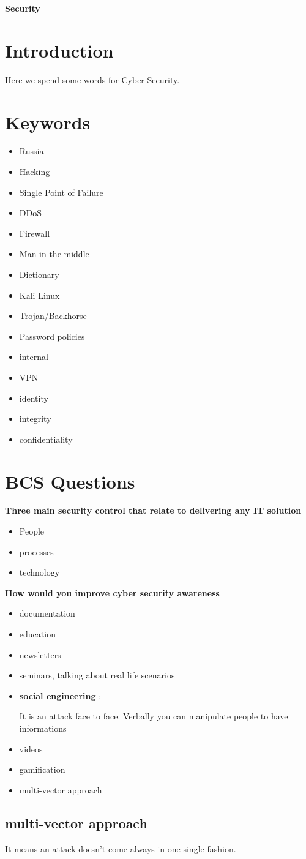 \documentclass[a4paper,12pt]{article}
\begin{document}
\textbf{Security}


\tableofcontents
\clearpage

 
\section{Introduction}
Here we spend some words for Cyber Security.
\section{Keywords}

\begin{itemize}
\item Russia
\item Hacking
\item Single Point of Failure
\item DDoS
\item Firewall
\item Man in the middle
\item Dictionary
\item Kali Linux
\item Trojan/Backhorse
\item Password policies
\item internal
\item VPN
\item identity 
\item integrity
\item confidentiality
\end{itemize}

\section{BCS Questions}

\textbf {Three main security control that relate to delivering any IT solution}
\begin{itemize}
\item People
\item processes
\item technology 
\end{itemize}


\textbf {How would you improve cyber security awareness}
\begin{itemize}
\item documentation
\item education
\item newsletters
\item seminars, talking about real life scenarios
\item \textbf{social engineering}
:

It is an attack face to face. Verbally you can manipulate people to have informations
\item videos
\item gamification
\item multi-vector approach
\end{itemize}

\subsection{multi-vector approach}
It means an attack doesn't come always in one single fashion. 


\clearpage

\printindex
\end{document}
